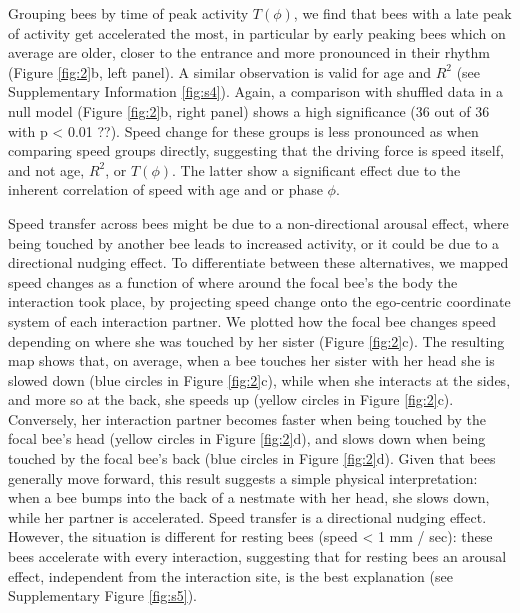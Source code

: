 \documentclass{article}
\begin{document}
Grouping bees by time of peak activity $T(\phi)$, we find that bees with a late peak of activity get accelerated the most, in particular by early peaking bees which on average are older, closer to the entrance and more pronounced in their rhythm (Figure \ref{fig:2}b, left panel). A similar observation is valid for age and $R^2$ (see Supplementary Information \ref{fig:s4}). Again, a comparison with shuffled data in a null model (Figure \ref{fig:2}b, right panel) shows a high significance (36 out of 36 with p < 0.01 ??). Speed change for these groups is less pronounced as when comparing speed groups directly, suggesting that the driving force is speed itself, and not age, $R^2$, or $T(\phi)$. The latter show a significant effect due to the inherent correlation of speed with age and or phase $\phi$.

Speed transfer across bees might be due to a non-directional arousal effect, where being touched by another bee leads to increased activity, or it could be due to a directional nudging effect. To differentiate between these alternatives, we mapped speed changes as a function of where around the focal bee's the body the interaction took place, by projecting speed change onto the ego-centric coordinate system of each interaction partner. We plotted how the focal bee changes speed depending on where she was touched by her sister (Figure \ref{fig:2}c). The resulting map shows that, on average, when a bee touches her sister with her head she is slowed down (blue circles in Figure \ref{fig:2}c), while when she interacts at the sides, and more so at the back, she speeds up (yellow circles in Figure \ref{fig:2}c). Conversely, her interaction partner becomes faster when being touched by the focal bee’s head (yellow circles in Figure \ref{fig:2}d), and slows down when being touched by the focal bee’s back (blue circles in Figure \ref{fig:2}d). Given that bees generally move forward, this result suggests a simple physical interpretation: when a bee bumps into the back of a nestmate with her head, she slows down, while her partner is accelerated. Speed transfer is a directional nudging effect. However, the situation is different for resting bees (speed < 1 mm / sec): these bees accelerate with every interaction, suggesting that for resting bees an arousal effect, independent from the interaction site, is the best explanation (see Supplementary Figure \ref{fig:s5}).
\end{document}
